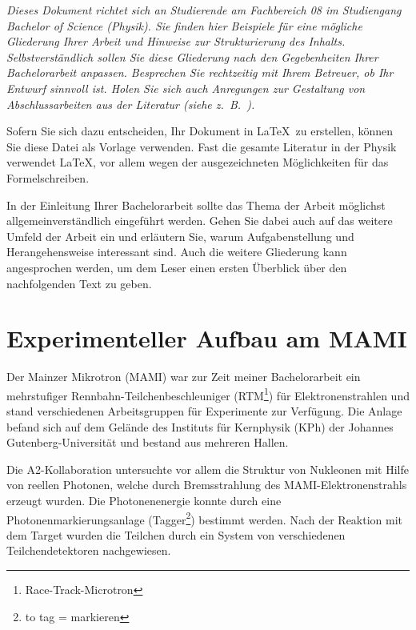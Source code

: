 \documentclass[a4paper,11pt,oneside,final,german,openbib,pdftex]{scrbook}
\begin{document}
{\em Dieses Dokument richtet sich an Studierende am Fachbereich 08 im 
Studiengang Bachelor of Science (Physik). Sie finden hier Beispiele 
f\"ur eine m\"ogliche Gliederung Ihrer Arbeit und Hinweise zur 
Strukturierung des Inhalts. Selbstverst\"andlich sollen Sie diese 
Gliederung nach den Gegebenheiten Ihrer Bachelorarbeit anpassen. 
Besprechen Sie rechtzeitig mit Ihrem Betreuer, ob Ihr Entwurf sinnvoll 
ist. Holen Sie sich auch Anregungen zur Gestaltung von Abschlussarbeiten 
aus der Literatur (siehe z.\ B.\ ).
\medskip

Sofern Sie sich dazu entscheiden, Ihr Dokument in \LaTeX\ zu erstellen, 
k\"onnen Sie diese Datei als Vorlage verwenden. Fast die gesamte 
Literatur in der Physik verwendet \LaTeX, vor allem wegen der 
ausgezeichneten M\"oglichkeiten f\"ur das Formelschreiben.
}
\bigskip

In der Einleitung Ihrer Bachelorarbeit sollte das Thema der Arbeit 
m\"oglichst allgemeinverst\"andlich eingef\"uhrt werden. Gehen Sie 
dabei auch auf das weitere Umfeld der Arbeit ein und erl\"autern Sie, 
warum Aufgabenstellung und Herangehensweise interessant sind. Auch 
die weitere Gliederung kann angesprochen werden, um dem Leser einen 
ersten \"Uberblick \"uber den nachfolgenden Text zu geben.

\chapter{Experimenteller Aufbau am MAMI}





Der Mainzer Mikrotron (MAMI) war zur Zeit meiner Bachelorarbeit ein mehrstufiger Rennbahn-Teilchenbeschleuniger (RTM\footnote{Race-Track-Microtron}) für Elektronenstrahlen und stand verschiedenen Arbeitsgruppen
 für Experimente zur Verfügung. Die Anlage befand sich auf dem Gelände des Instituts für Kernphysik (KPh) der Johannes Gutenberg-Universität 
und bestand aus mehreren Hallen.

Die A2-Kollaboration untersuchte vor allem die Struktur von Nukleonen mit Hilfe von reellen Photonen, welche durch Bremsstrahlung des MAMI-Elektronenstrahls erzeugt wurden. Die Photonenenergie konnte durch eine Photonenmarkierungsanlage (Tagger\footnote{to tag = markieren}) bestimmt werden. Nach der Reaktion mit dem Target wurden die Teilchen durch ein System von verschiedenen Teilchendetektoren nachgewiesen.
\end{document}
